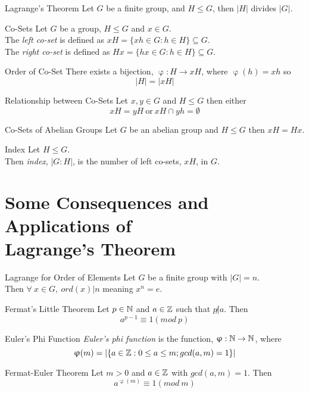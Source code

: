 \documentclass[11pt,a4paper]{article}
\begin{document}
\subtitle{Theorem 11.01 - }{Lagrange's Theorem}
Let $G$ be a finite group, and $H \leq G$, then $|H|$ divides $|G|$.\\

\subtitle{Definition 11.02 - }{Co-Sets}
Let $G$ be a group, $H \leq G$ and $x \in G$.\\
The \textit{left co-set} is defined as $xH = \{xh \in G : h \in H\} \subseteq G$.\\
The \textit{right co-set} is defined as $Hx = \{hx \in G : h \in H\} \subseteq G$.\\

\subtitle{Theorem 11.03 - }{Order of Co-Set}
There exists a bijection, $\upvarphi : H \to xH$, where $\upvarphi(h) = xh$ so $$|H| = |xH|$$

\subtitle{Theorem 11.04 - }{Relationship between Co-Sets}
Let $x, y \in G$ and $H \leq G$ then either
$$xH = yH \mathrm{\ or\ } xH \cap yh = \emptyset$$

\subtitle{Theorem 11.05 - }{Co-Sets of Abelian Groups}
Let $G$ be an abelian group and $H \leq G$ then $xH = Hx$.\\

\subtitle{Definition 11.06 - }{Index}
Let $H \leq G$.\\
Then \textit{index}, $|G : H|$, is the number of left co-sets, $xH$, in $G$.

\section{Some Consequences and Applications of\\ Lagrange's Theorem}

\subtitle{Propostion 12.01 - }{Lagrange for Order of Elements}
Let $G$ be a finite group with $|G| = n$.\\
Then $\forall\ x \in G,\ ord(x) | n$ meaning $x^n = e$.\\

\subtitle{Theorem 12.02 - }{Fermat's Little Theorem}
Let $p \in \mathbb{N}$ and $a \in \mathbb{Z}$ such that $p \not | a$. Then
$$a^{p-1} \equiv 1 (mod\ p)$$

\subtitle{Definition 12.03 - }{Euler's Phi Function}
\textit{Euler's phi function} is the function, $\upvarphi : \mathbb{N} \to \mathbb{N}$, where
$$\upvarphi(m) = |\{ a \in \mathbb{Z} : 0 \leq a \leq m; gcd(a, m) = 1 \}|$$

\subtitle{Theorem 12.04 - }{Fermat-Euler Theorem}
Let $m > 0$ and $a \in \mathbb{Z}$ with $gcd(a, m) = 1$. Then
$$a^{\upvarphi(m)} \equiv 1 (mod\ m)$$
\end{document}
